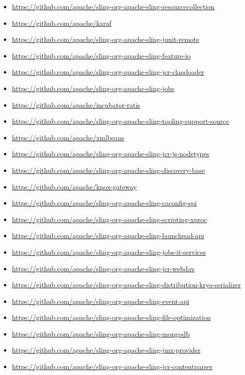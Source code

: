 \documentclass[sigconf]{acmart}
\begin{document}
\begin{itemize}
  \item \url{https://github.com/apache/sling-org-apache-sling-resourcecollection}
  \item \url{https://github.com/apache/karaf}
  \item \url{https://github.com/apache/sling-org-apache-sling-junit-remote}
  \item \url{https://github.com/apache/sling-org-apache-sling-feature-io}
  \item \url{https://github.com/apache/sling-org-apache-sling-jcr-classloader}
  \item \url{https://github.com/apache/sling-org-apache-sling-jobs}
  \item \url{https://github.com/apache/incubator-ratis}
  \item \url{https://github.com/apache/sling-org-apache-sling-tooling-support-source}
  \item \url{https://github.com/apache/xmlbeans}
  \item \url{https://github.com/apache/sling-org-apache-sling-jcr-js-nodetypes}
  \item \url{https://github.com/apache/sling-org-apache-sling-discovery-base}
  \item \url{https://github.com/apache/knox-gateway}
  \item \url{https://github.com/apache/sling-org-apache-sling-caconfig-spi}
  \item \url{https://github.com/apache/sling-org-apache-sling-scripting-xproc}
  \item \url{https://github.com/apache/sling-org-apache-sling-launchpad-api}
  \item \url{https://github.com/apache/sling-org-apache-sling-jobs-it-services}
  \item \url{https://github.com/apache/sling-org-apache-sling-jcr-webdav}
  \item \url{https://github.com/apache/sling-org-apache-sling-distribution-kryo-serializer}
  \item \url{https://github.com/apache/sling-org-apache-sling-event-api}
  \item \url{https://github.com/apache/sling-org-apache-sling-file-optimization}
  \item \url{https://github.com/apache/sling-org-apache-sling-mongodb}
  \item \url{https://github.com/apache/sling-org-apache-sling-jmx-provider}
  \item \url{https://github.com/apache/sling-org-apache-sling-jcr-contentparser}

\end{itemize}
\end{document}
